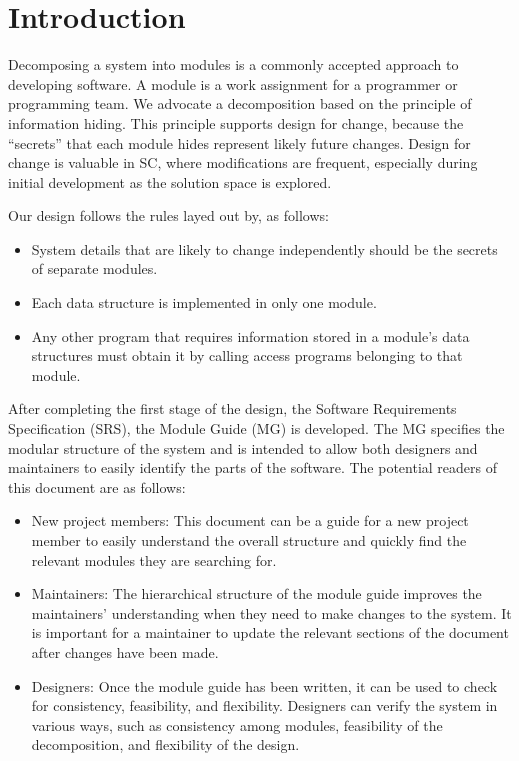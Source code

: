 \documentclass[12pt, titlepage]{article}
\begin{document}
\newpage

\tableofcontents

\listoftables

\listoffigures

\newpage


\section{Introduction}

Decomposing a system into modules is a commonly accepted approach to developing
software.  A module is a work assignment for a programmer or programming
team.  We advocate a decomposition
based on the principle of information hiding.  This
principle supports design for change, because the ``secrets'' that each module
hides represent likely future changes.  Design for change is valuable in SC,
where modifications are frequent, especially during initial development as the
solution space is explored.  

Our design follows the rules layed out by, as follows:
\begin{itemize}
\item System details that are likely to change independently should be the
  secrets of separate modules.
\item Each data structure is implemented in only one module.
\item Any other program that requires information stored in a module's data
  structures must obtain it by calling access programs belonging to that module.
\end{itemize}

After completing the first stage of the design, the Software Requirements
Specification (SRS), the Module Guide (MG) is developed. The MG
specifies the modular structure of the system and is intended to allow both
designers and maintainers to easily identify the parts of the software.  The
potential readers of this document are as follows:

\begin{itemize}
\item New project members: This document can be a guide for a new project member
  to easily understand the overall structure and quickly find the
  relevant modules they are searching for.
\item Maintainers: The hierarchical structure of the module guide improves the
  maintainers' understanding when they need to make changes to the system. It is
  important for a maintainer to update the relevant sections of the document
  after changes have been made.
\item Designers: Once the module guide has been written, it can be used to
  check for consistency, feasibility, and flexibility. Designers can verify the
  system in various ways, such as consistency among modules, feasibility of the
  decomposition, and flexibility of the design.
\end{itemize}
\end{document}
